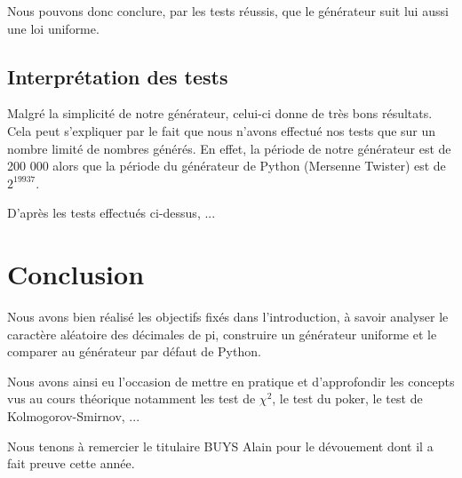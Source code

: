 \documentclass[10pt,a4paper]{article}
\begin{document}
Nous pouvons donc conclure, par les tests réussis, que le générateur suit lui aussi une loi uniforme.
  	
	\newpage
	\subsection{Interprétation des tests}
	Malgré la simplicité de notre générateur, celui-ci donne de très bons résultats.
	Cela peut s'expliquer par le fait que nous n'avons effectué nos tests que sur un nombre limité de nombres générés. 
	En effet, la période de notre générateur est de 200 000 alors que la période du générateur de Python (Mersenne Twister) est de $2^{19937}$.
	
	D'après les tests effectués ci-dessus, ... %
	
	\newpage
	\section{Conclusion}
	Nous avons bien réalisé les objectifs fixés dans l'introduction, à savoir analyser le caractère aléatoire des décimales de pi, construire un générateur uniforme et le comparer au générateur par défaut de Python.
	
	Nous avons ainsi eu l'occasion de mettre en pratique et d'approfondir les concepts vus au cours théorique notamment les test de $\chi^2$, le test du poker, le test de Kolmogorov-Smirnov, ...
	
	Nous tenons à remercier le titulaire BUYS Alain pour le dévouement dont il a fait preuve cette année.
	
\end{document}
